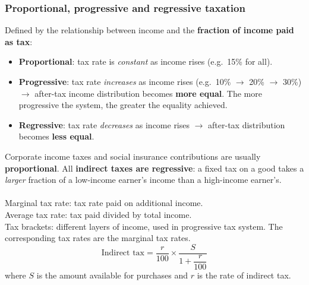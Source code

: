 \subsubsection*{Proportional, progressive and regressive taxation}
Defined by the relationship between income and the \textbf{fraction of income paid as tax}:
\begin{itemize}
  \item \textbf{Proportional}: tax rate is \textit{constant} as income rises (e.g.\ 15\% for all).
  \item \textbf{Progressive}: tax rate \textit{increases} as income rises (e.g.\ 10\% $\to$ 20\% $\to$ 30\%) $\to$ after-tax income distribution becomes \textbf{more equal}. The more progressive the system, the greater the equality achieved.
  \item \textbf{Regressive}: tax rate \textit{decreases} as income rises $\to$ after-tax distribution becomes \textbf{less equal}.
\end{itemize}
Corporate income taxes and social insurance contributions are usually \textbf{proportional}. All \textbf{indirect taxes are regressive}: a fixed tax on a good takes a \textit{larger} fraction of a low-income earner's income than a high-income earner's. 
\\\\Marginal tax rate: tax rate paid on additional income.\\
Average tax rate: tax paid divided by total income.\\
Tax brackets: different layers of income, used in progressive tax system. The corresponding tax rates are the marginal tax rates.
\[\text{Indirect tax}=\dfrac{r}{100}\times \dfrac{S}{1+\dfrac{r}{100}}\]
where $S$ is the amount available for purchases and $r$ is the rate of indirect tax.

